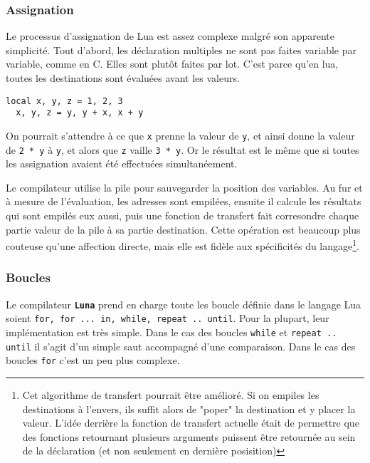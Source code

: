 \documentclass{article}
\newcommand{\luna}{\textbf{\texttt{Luna}}}
\begin{document}
\subsubsection{Assignation}
Le processus d'assignation de Lua est assez complexe malgré son apparente simplicité. Tout d'abord, les déclaration multiples ne sont pas faites variable par variable, comme en C. Elles sont plutôt faites par lot.
C'est parce qu'en lua, toutes les destinations sont évaluées avant les valeurs.
\begin{lstlisting}[style=lua, caption={Déclaration multiple},label=DescriptiveLabel]
  local x, y, z = 1, 2, 3
  x, y, z = y, y + x, x + y
\end{lstlisting}
On pourrait s'attendre à ce que \texttt{x} prenne la valeur de \texttt{y}, et ainsi donne la valeur de \texttt{2 * y} à \texttt{y}, et alors que \texttt{z} vaille \texttt{3 * y}. Or le résultat est le même que si toutes les assignation avaient été effectuées simultanéement.

Le compilateur utilise la pile pour sauvegarder la position des variables. Au fur et à mesure de l'évaluation, les adresses sont empilées, ensuite il calcule les résultats qui sont empilés eux aussi, puis une fonction de transfert fait corresondre chaque partie valeur de la pile à sa partie destination. Cette opération est beaucoup plus couteuse qu'une affection directe, mais elle est fidèle aux spécificités du langage\footnote{Cet algorithme de transfert pourrait être amélioré. Si on empiles les destinations à l'envers, ils suffit alors de "poper" la destination et y placer la valeur. L'idée derrière la fonction de transfert actuelle était de permettre que des fonctions retournant plusieurs arguments puissent être retournée au sein de la déclaration (et non seulement en dernière posisition)}.

\subsubsection{Boucles}
Le compilateur \luna{} prend en charge toute les boucle définie dans le langage Lua soient {\lstset{style=lua}\lstinline$for, for ... in, while, repeat .. until$}. Pour la plupart, leur implémentation est très simple. Dans le cas des boucles {\lstset{style=lua}\lstinline$while$} et {\lstset{style=lua}\lstinline$repeat .. until$} il s'agit d'un simple saut accompagné d'une comparaison. Dans le cas des boucles {\lstset{style=lua}\lstinline$for$} c'est un peu plus complexe.
\end{document}
